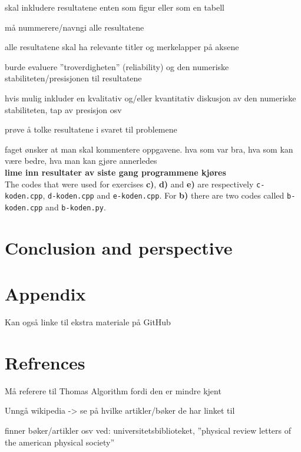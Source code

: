\documentclass{article}
\begin{document}
  skal inkludere resultatene enten som figur eller som en tabell

  må nummerere/navngi alle resultatene

  alle resultatene skal ha relevante titler og merkelapper på aksene

  burde evaluere ''troverdigheten'' (reliability) og den numeriske stabiliteten/presisjonen til resultatene

  hvis mulig inkluder en kvalitativ og/eller kvantitativ diskusjon av den numeriske stabiliteten, tap av presisjon osv

  prøve å tolke resultatene i svaret til problemene

  faget ønsker at man skal kommentere oppgavene. hva som var bra, hva som kan være bedre, hva man kan gjøre annerledes \\

  {\bf lime inn resultater av siste gang programmene kjøres} \\


  The codes that were used for exercises \textbf{c)}, \textbf{d)} and \textbf{e)} are respectively \texttt{c-koden.cpp}, \texttt{d-koden.cpp} and \texttt{e-koden.cpp}. For \textbf{b)} there are two codes called \texttt{b-koden.cpp} and \texttt{b-koden.py}.




\vspace{1cm}

\section{Conclusion and perspective}






\vspace{1cm}

\section{Appendix}

  Kan også linke til ekstra materiale på GitHub





\vspace{1cm}

\section{Refrences}

  Må referere til Thomas Algorithm fordi den er mindre kjent

  Unngå wikipedia -> se på hvilke artikler/bøker de har linket til

  finner bøker/artikler osv ved: universitetsbiblioteket, ''physical review letters of the american physical society''




\end{document}
